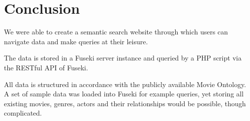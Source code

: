\section{Conclusion}
We were able to create a semantic search website through which users can navigate data and make queries at their leisure.

The data is stored in a Fuseki server instance and queried by a PHP script via the RESTful API of Fuseki.

All data is structured in accordance with the publicly available Movie Ontology. A set of sample data was loaded into Fuseki for example queries, yet storing all existing movies, genres, actors and their relationships would be possible, though complicated.